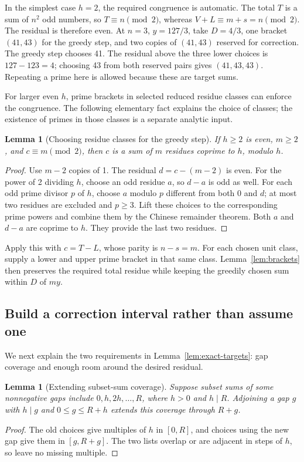 \documentclass[11pt]{article}
\newtheorem{lemma}[theorem]{Lemma}
\theoremstyle{definition}
\begin{document}
In the simplest case \(h=2\), the required congruence is automatic. The total
\(T\) is a sum of \(n^2\) odd numbers, so \(T\equiv n\pmod2\), whereas
\(V+L\equiv m+s=n\pmod2\). The residual is therefore even. At \(n=3\),
\(y=127/3\), take \(D=4/3\), one bracket \((41,43)\) for the greedy step,
and two copies of \((41,43)\) reserved for correction. The greedy step chooses
41. The residual above the three lower choices is \(127-123=4\); choosing 43
from both reserved pairs gives \((41,43,43)\). Repeating a prime here is allowed
because these are target sums.

For larger even \(h\), prime brackets in selected reduced residue classes
can enforce the congruence. The following elementary fact explains the choice
of classes; the existence of primes in those classes is a separate analytic input.

\begin{lemma}[Choosing residue classes for the greedy step]\label{lem:units}
If \(h\ge2\) is even, \(m\ge2\), and \(c\equiv m\pmod2\), then \(c\) is a sum of
\(m\) residues coprime to \(h\), modulo \(h\).
\end{lemma}
\begin{proof}
Use \(m-2\) copies of 1. The residual \(d=c-(m-2)\) is even. For the power of 2
dividing \(h\), choose an odd residue \(a\), so \(d-a\) is odd as well. For
each odd prime divisor \(p\) of \(h\), choose \(a\) modulo \(p\) different from
both 0 and \(d\); at most two residues are excluded and \(p\ge3\). Lift these
choices to the corresponding prime powers and combine them by the Chinese
remainder theorem. Both \(a\) and \(d-a\) are coprime to \(h\). They provide
the last two residues.
\end{proof}

Apply this with \(c=T-L\), whose parity is \(n-s=m\). For each chosen
unit class, supply a lower and upper prime bracket in that same class.
Lemma~\ref{lem:brackets} then preserves the required total residue while
keeping the greedily chosen sum within \(D\) of \(my\).

\subsection{Build a correction interval rather than assume one}

We next explain the two requirements in Lemma~\ref{lem:exact-targets}: gap
coverage and enough room around the desired residual.

\begin{lemma}[Extending subset-sum coverage]\label{lem:grid}
Suppose subset sums of some nonnegative gaps include
\(0,h,2h,\ldots,R\), where \(h>0\) and \(h\mid R\). Adjoining a gap \(g\)
with \(h\mid g\) and \(0\le g\le R+h\) extends this coverage through \(R+g\).
\end{lemma}
\begin{proof}
The old choices give multiples of \(h\) in \([0,R]\), and choices using the
new gap give them in \([g,R+g]\). The two lists overlap or are adjacent in
steps of \(h\), so leave no missing multiple.
\end{proof}
\end{document}
